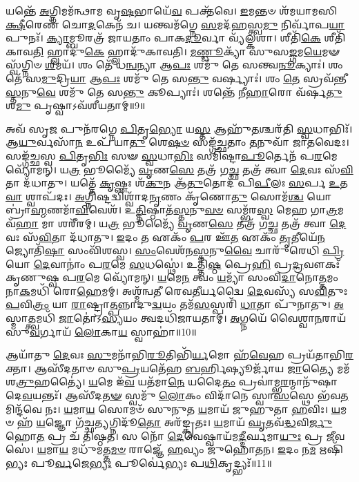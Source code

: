 𑌯𑌨𑍍𑌤𑍇᳴ \ul{𑌅}\-𑌗𑍍𑌨𑌿𑌮𑌮᳴𑌨𑍍𑌥𑌾𑌮 𑌵𑍃\-\ul{𑌷}\-𑌭𑌾𑌯𑍇᳴\-\ul{𑌵} 𑌪𑌕𑍍𑌤᳴𑌵𑍇। 
\-\ul{𑌇}\-𑌮𑌨𑍍𑌤𑍞 𑌶᳴𑌮𑌯𑌾𑌮𑌸𑌿 \ul{𑌕𑍍𑌷𑍀}\-𑌰𑍇𑌣᳴ 𑌚𑍋\-\ul{𑌦}\-𑌕𑍇𑌨᳴ 𑌚। 
𑌯𑌨𑍍𑌤𑍍𑌵𑌮᳴𑌗𑍍𑌨𑍇 \ul{𑌸}\-𑌮𑌦᳴\-\ul{𑌹}\-𑌸𑍍𑌤𑍍𑌵\-\ul{𑌮𑍁} 𑌨𑌿𑌰𑍍𑌵𑌾᳴𑌪\-\ul{𑌯𑌾} 𑌪𑍁𑌨𑌃᳴। 
\-\ul{𑌕𑍍𑌯𑌾}\-𑌮𑍍𑌬𑍂𑌰𑌤𑍍𑌰᳴ 𑌜𑌾𑌯𑌤𑌾𑌂 𑌪𑌾𑌕\-\ul{𑌦𑍂}\-𑌰𑍍𑌵𑌾 𑌵𑍍𑌯᳴𑌲𑍍𑌕𑌶𑌾। 
𑌶𑍀𑌤𑌿᳴\-\ul{𑌕𑍇} 𑌶𑍀𑌤𑌿᳴𑌕𑌾𑌵\-\ul{𑌤𑌿} 𑌹𑍍𑌲𑌾𑌦𑍁᳴\-\ul{𑌕𑍇} 𑌹𑍍𑌲𑌾𑌦𑍁᳴𑌕𑌾𑌵𑌤𑌿। 
\-\ul{𑌮}\-\-\ul{𑌣𑍍𑌡𑍂}\-𑌕𑍍𑌯𑌾᳴ 𑌸𑍁𑌸\-\ul{𑌙𑍍𑌗}\-𑌮\-\ul{𑌯𑍇}\-𑌮𑍟 𑌸𑍍𑌵᳴𑌗𑍍𑌨𑌿𑍞 \ul{𑌶}\-𑌮𑌯᳴। 
𑌶𑌂 𑌤𑍇᳴ 𑌧\-\ul{𑌨𑍍𑌵}\-𑌨𑍍𑌯𑌾 𑌆\-\ul{𑌪𑌃} 𑌶𑌮𑍁᳴ 𑌤𑍇 𑌸𑌨𑍍𑌤𑍍𑌵\-\ul{𑌨𑍂}\-𑌕𑍍𑌯𑌾𑌃॑। 
𑌶𑌂 𑌤𑍇᳴ 𑌸\-\ul{𑌮𑍁}\-𑌦𑍍𑌰𑌿\-\ul{𑌯𑌾} 𑌆\-\ul{𑌪𑌃} 𑌶𑌮𑍁᳴ 𑌤𑍇 𑌸\-\ul{𑌨𑍍𑌤𑍁} 𑌵𑌰𑍍𑌷𑍍𑌯𑌾𑌃॑। 
𑌶𑌂 \ul{𑌤𑍇} 𑌸𑍍𑌰𑌵᳴𑌨𑍍𑌤𑍀\-\ul{𑌸𑍍𑌤}\-𑌨𑍁\-\ul{𑌵𑍇} 𑌶𑌮𑍁᳴ 𑌤𑍇 𑌸\-\ul{𑌨𑍍𑌤𑍁} 𑌕𑍂𑌪𑍍𑌯𑌾𑌃॑। 
𑌶𑌨𑍍𑌤𑍇᳴ 𑌨𑍀\-\ul{𑌹𑌾}\-𑌰𑍋 𑌵᳴𑌰𑍍\mbox{}𑌷\-\ul{𑌤𑍁} 𑌶\-\ul{𑌮𑍁} 𑌪𑍃𑌷𑍍𑌵𑌾𑌽𑌵᳴𑌶𑍀𑌯𑌤𑌾𑌮𑍍॥9॥

𑌅𑌵᳴ 𑌸𑍃\-\ul{𑌜} 𑌪𑍁𑌨᳴𑌰𑌗𑍍𑌨𑍇 \ul{𑌪𑌿}\-𑌤𑍃\-\ul{𑌭𑍍𑌯𑍋} 𑌯\-\ul{𑌸𑍍𑌤} 𑌆𑌹𑍁᳴\-\ul{𑌤}\-𑌶𑍍𑌚𑌰᳴𑌤𑌿 \ul{𑌸𑍍𑌵}\-𑌧𑌾𑌭𑌿𑌃᳴। 
𑌆\-\ul{𑌯𑍁}\-𑌰𑍍𑌵𑌸𑌾᳴\-\ul{𑌨} 𑌉𑌪᳴ 𑌯𑌾\-\ul{𑌤𑍁} 𑌶𑍇\-\ul{𑌷}\-\-\ul{𑍞} 𑌸𑌙𑍍𑌗᳴𑌚𑍍𑌛𑌤𑌾𑌂 \ul{𑌤}\-𑌨𑍁𑌵𑌾᳴ 𑌜𑌾𑌤𑌵𑍇𑌦𑌃। 
𑌸𑌙𑍍𑌗᳴𑌚𑍍𑌛𑌸𑍍𑌵 \ul{𑌪𑌿}\-𑌤𑍃\-\ul{𑌭𑌿𑌃} 𑌸𑍟 \ul{𑌸𑍍𑌵}\-𑌧𑌾\-\ul{𑌭𑌿𑌃} 𑌸𑌮𑌿᳴𑌷𑍍𑌟𑌾\-\ul{𑌪𑍂}\-𑌰𑍍𑌤𑍇𑌨᳴ 𑌪\-\ul{𑌰}\-𑌮𑍇 𑌵𑍍𑌯𑍋᳴𑌮𑌨𑍍। 
𑌯\-\ul{𑌤𑍍𑌰} 𑌭𑍂𑌮𑍍𑌯𑍈᳴ \ul{𑌵𑍃}\-𑌣\-\ul{𑌸𑍇} 𑌤𑌤𑍍𑌰᳴ 𑌗\-\ul{𑌚𑍍𑌛} 𑌤𑌤𑍍𑌰᳴ 𑌤𑍍𑌵𑌾 \ul{𑌦𑍇}\-𑌵𑌃 𑌸᳴\-\ul{𑌵𑌿}\-𑌤𑌾 𑌦᳴𑌧𑌾𑌤𑍁। 
𑌯𑌤𑍍𑌤𑍇᳴ \ul{𑌕𑍃}\-𑌷𑍍𑌣𑌃  𑌶᳴\-\ul{𑌕𑍁}\-𑌨 𑌆᳴\-\ul{𑌤𑍁}\-𑌤𑍋𑌦᳴ 𑌪𑌿\-\ul{𑌪𑍀}\-𑌲𑌃 \ul{𑌸}\-𑌰𑍍𑌪 \ul{𑌉}\-𑌤 \ul{𑌵𑌾} 𑌶𑍍𑌵𑌾𑌪᳴𑌦𑌃। 
\-\ul{𑌅}\-𑌗𑍍𑌨𑌿𑌷𑍍𑌟𑌦𑍍𑌵𑌿𑌶𑍍𑌵𑌾᳴𑌦\-\ul{𑌨𑍃}\-𑌣𑌂 𑌕𑍃᳴𑌣𑍋\-\ul{𑌤𑍁} 𑌸𑍋𑌮᳴\-\ul{𑌶𑍍𑌚} 𑌯𑍋 𑌬𑍍𑌰𑌾॑\-\ul{𑌹𑍍𑌮}\-𑌣𑌮𑌾᳴\-\ul{𑌵𑌿}\-𑌵𑍇𑌶᳴। 
𑌉\-\ul{𑌤𑍍𑌤𑌿}\-𑌷𑍍𑌠𑌾𑌤᳴\-\ul{𑌸𑍍𑌤}\-𑌨𑍁\-\ul{𑌵}\-\-\ul{𑍞} 𑌸𑌮𑍍𑌭᳴𑌰\-\ul{𑌸𑍍𑌵} 𑌮𑍇𑌹 𑌗𑌾\-\ul{𑌤𑍍𑌰}\-𑌮𑌵᳴\-\ul{𑌹𑌾} 𑌮𑌾 𑌶𑌰𑍀᳴𑌰𑌮𑍍। 
𑌯\-\ul{𑌤𑍍𑌰} 𑌭𑍂𑌮𑍍𑌯𑍈᳴ \ul{𑌵𑍃}\-𑌣\-\ul{𑌸𑍇} 𑌤𑌤𑍍𑌰᳴ 𑌗\-\ul{𑌚𑍍𑌛} 𑌤𑌤𑍍𑌰᳴ 𑌤𑍍𑌵𑌾 \ul{𑌦𑍇}\-𑌵𑌃 𑌸᳴\-\ul{𑌵𑌿}\-𑌤𑌾 𑌦᳴𑌧𑌾𑌤𑍁। 
\-\ul{𑌇}\-𑌦𑌂 \ul{𑌤} 𑌏𑌕𑌂᳴ \ul{𑌪}\-𑌰 𑌊᳴\-\ul{𑌤} 𑌏𑌕𑌂᳴ \ul{𑌤𑍃}\-𑌤𑍀𑌯𑍇᳴\-\ul{𑌨} 𑌜𑍍𑌯𑍋𑌤𑌿᳴\-\ul{𑌷𑌾} 𑌸𑌂𑌵𑌿᳴𑌶𑌸𑍍𑌵। 
\-\ul{𑌸𑌂}\-𑌵𑍇𑌶᳴𑌨\-\ul{𑌸𑍍𑌤}\-𑌨𑍁\-\ul{𑌵𑍈} 𑌚𑌾𑌰𑍁᳴𑌰𑍇𑌧𑌿 \ul{𑌪𑍍𑌰𑌿}\-𑌯𑍋 \ul{𑌦𑍇}\-𑌵𑌾𑌨𑌾𑌂॑ 𑌪\-\ul{𑌰}\-𑌮𑍇 \ul{𑌸}\-𑌧𑌸𑍍𑌥𑍇॑। 
𑌉𑌤𑍍𑌤𑌿᳴\-\ul{𑌷𑍍𑌠} 𑌪𑍍𑌰𑍇\-\ul{𑌹𑌿} 𑌪𑍍𑌰\-\ul{𑌦𑍍𑌰}\-𑌵𑍗𑌕𑌃᳴ 𑌕𑍃𑌣𑍁𑌷𑍍𑌵 𑌪\-\ul{𑌰}\-𑌮𑍇 𑌵𑍍𑌯𑍋᳴𑌮𑌨𑍍। 
\-\ul{𑌯}\-𑌮𑍇\-\ul{𑌨} 𑌤𑍍𑌵𑌂 \ul{𑌯}\-𑌮𑍍𑌯𑌾᳴ 𑌸𑌂𑌵𑌿\-\ul{𑌦𑌾}\-𑌨𑍋\-\ul{𑌤𑍍𑌤}\-𑌮𑌂 𑌨𑌾\-\ul{𑌕}\-𑌮𑌧𑌿᳴ 𑌰𑍋\-\ul{𑌹𑍇}\-𑌮𑌮𑍍। 
𑌅𑌶𑍍𑌮᳴𑌨𑍍𑌵𑌤𑍀 𑌰𑍇𑌵\-\ul{𑌤𑍀}\-𑌰𑍍𑌯𑌦𑍍𑌵𑍈 \ul{𑌦𑍇}\-𑌵𑌸𑍍𑌯᳴ 𑌸\-\ul{𑌵𑌿}\-𑌤𑍁𑌃 \ul{𑌪}\-𑌵𑌿\-\ul{𑌤𑍍𑌰𑌂} 𑌯𑌾 \ul{𑌰𑌾}\-𑌷𑍍𑌟𑍍𑌰𑌾\-\ul{𑌤𑍍𑌪}\-𑌨𑍍𑌨𑌾𑌦𑍁\-\ul{𑌦𑍍𑌵}\-𑌯𑌂 𑌤𑌮᳴\-\ul{𑌸}\-𑌸𑍍𑌪𑌰𑌿᳴ \ul{𑌧𑌾}\-𑌤𑌾 𑌪𑍁᳴𑌨𑌾𑌤𑍁। 
\-\ul{𑌅}\-𑌸𑍍𑌮𑌾𑌤𑍍𑌤𑍍𑌵𑌮𑌧𑌿᳴ \ul{𑌜𑌾}\-𑌤𑍋॑𑌽\-\ul{𑌸𑍍𑌯}\-𑌯𑌂 𑌤𑍍𑌵𑌦𑌧𑌿᳴𑌜𑌾𑌯𑌤𑌾𑌮𑍍। 
\-\ul{𑌅}\-𑌗𑍍𑌨𑌯𑍇᳴ 𑌵𑍈𑌶𑍍𑌵𑌾\-\ul{𑌨}\-𑌰𑌾𑌯᳴ 𑌸𑍁\-\ul{𑌵}\-𑌰𑍍𑌗𑌾𑌯᳴ \ul{𑌲𑍋}\-𑌕𑌾\-\ul{𑌯} 𑌸𑍍𑌵𑌾𑌹𑌾॑॥10॥
\anuvakamend[𑌅𑌵᳴𑌶𑍀𑌯𑌤𑌾𑍞 \ul{𑌸}\-𑌧\-\ul{𑌸𑍍𑌥𑍇} 𑌪𑌞𑍍𑌚᳴ 𑌚]

𑌆𑌯𑌾᳴𑌤𑍁 \ul{𑌦𑍇}\-𑌵𑌃 \ul{𑌸𑍁}\-𑌮𑌨𑌾᳴𑌭𑌿\-\ul{𑌰𑍂}\-𑌤𑌿𑌭𑌿᳴\-\ul{𑌰𑍍𑌯}\-𑌮𑍋 𑌹᳴\-\ul{𑌵𑍇}\-𑌹 𑌪𑍍𑌰𑌯᳴𑌤𑌾𑌭𑌿\-\ul{𑌰}\-𑌕𑍍𑌤𑌾। 
𑌆𑌸𑍀᳴𑌦𑌤𑌾𑍞 𑌸𑍁\-\ul{𑌪𑍍𑌰}\-𑌯𑌤𑍇᳴𑌹 \ul{𑌬}\-𑌰𑍍\mbox{}𑌹𑌿𑌷𑍍𑌯𑍂𑌰𑍍𑌜𑌾᳴𑌯 \ul{𑌜𑌾}\-𑌤𑍍𑌯𑍈 𑌮𑌮᳴ 𑌶\-\ul{𑌤𑍍𑌰𑍁}\-𑌹𑌤𑍍𑌯𑍈॑। 
\-\ul{𑌯}\-𑌮𑍇 𑌇᳴\-\ul{𑌵} 𑌯𑌤᳴𑌮𑌾\-\ul{𑌨𑍇} 𑌯𑌦𑍈\-\ul{𑌤𑌂} 𑌪𑍍𑌰𑌵𑌾॑𑌮𑍍𑌭\-\ul{𑌰}\-𑌨𑍍𑌮𑌾𑌨𑍁᳴𑌷𑌾 𑌦𑍇\-\ul{𑌵}\-𑌯𑌨𑍍𑌤𑌃᳴। 
𑌆𑌸𑍀᳴𑌦\-\ul{𑌤}\-\-\ul{𑍟} 𑌸𑍍𑌵𑌮𑍁᳴ \ul{𑌲𑍋}\-𑌕𑌂  𑌵𑌿𑌦𑌾᳴𑌨𑍇 𑌸𑍍𑌵𑌾\-\ul{𑌸}\-𑌸𑍍𑌥𑍇 𑌭᳴𑌵\-\ul{𑌤}\-𑌮𑌿𑌨𑍍𑌦᳴𑌵𑍇 𑌨𑌃। 
\-\ul{𑌯}\-𑌮𑌾\-\ul{𑌯} 𑌸𑍋𑌮𑍞᳴ 𑌸𑍁𑌨𑍁𑌤 \ul{𑌯}\-𑌮𑌾𑌯᳴ 𑌜𑍁𑌹𑍁𑌤𑌾 \ul{𑌹}\-𑌵𑌿𑌃। 
\-\ul{𑌯}\-𑌮𑍞 𑌹᳴ \ul{𑌯}\-𑌜𑍍𑌞𑍋 𑌗᳴𑌚𑍍𑌛\-\ul{𑌤𑍍𑌯}\-𑌗𑍍𑌨𑌿𑌦𑍂᳴\-\ul{𑌤𑍋} 𑌅𑌰᳴𑌙𑍍𑌕𑍃𑌤𑌃। 
\-\ul{𑌯}\-𑌮𑌾𑌯᳴ \ul{𑌘𑍃}\-𑌤𑌵᳴\-\ul{𑌦𑍍𑌧}\-𑌵𑌿\-\ul{𑌰𑍍𑌜𑍁}\-𑌹𑍋\-\ul{𑌤} 𑌪𑍍𑌰 𑌚᳴ 𑌤𑌿𑌷𑍍𑌠𑌤। 
𑌸 𑌨𑍋᳴ \ul{𑌦𑍇}\-𑌵𑍇𑌷𑍍𑌵𑌾𑌯᳴𑌮\-\ul{𑌦𑍍𑌦𑍀}\-𑌰𑍍𑌘𑌮𑌾\-\ul{𑌯𑍁𑌃} 𑌪𑍍𑌰 \ul{𑌜𑍀}\-𑌵𑌸𑍇॑। 
\-\ul{𑌯}\-𑌮𑌾\-\ul{𑌯} 𑌮𑌧𑍁᳴𑌮𑌤𑍍𑌤\-\ul{𑌮}\-\-\ul{𑍞} 𑌰𑌾𑌜𑍍𑌞𑍇᳴ \ul{𑌹}\-𑌵𑍍𑌯𑌂 𑌜𑍁᳴𑌹𑍋𑌤𑌨। 
\-\ul{𑌇}\-𑌦𑌂 𑌨\-\ul{𑌮} 𑌋𑌷𑌿᳴𑌭𑍍𑌯𑌃 𑌪𑍂\-\ul{𑌰𑍍𑌵}\-𑌜𑍇\-\ul{𑌭𑍍𑌯𑌃} 𑌪𑍂𑌰𑍍𑌵𑍇॑𑌭𑍍𑌯𑌃 𑌪\-\ul{𑌥𑌿}\-𑌕𑍃𑌦𑍍𑌭𑍍𑌯𑌃᳴॥11॥

